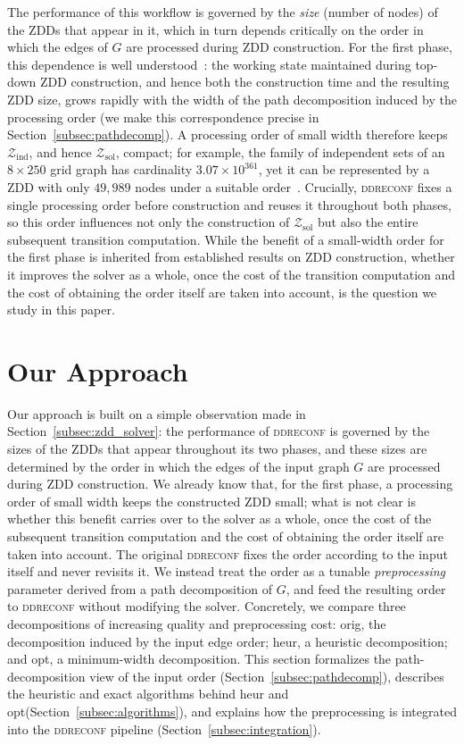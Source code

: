 \documentclass[conference]{IEEEtran}
\newcommand{\zind}{\mathcal{Z}_{\mathrm{ind}}}
\newcommand{\zsol}{\mathcal{Z}_{\mathrm{sol}}}
\newcommand{\OrigDecom}{\textsf{orig}\xspace}
\newcommand{\HeurDecom}{\textsf{heur}\xspace}
\newcommand{\OptDecom}{\textsf{opt}\xspace}
\begin{document}
The performance of this workflow is governed by the \emph{size} (number of
nodes) of the ZDDs that appear in it, which in turn depends critically on the
order in which the edges of $G$ are processed during ZDD construction. For the
first phase, this dependence is well understood~\cite{inoue16}: the working state
maintained during top-down ZDD construction, and hence both the construction
time and the resulting ZDD size, grows rapidly with the width of the path
decomposition induced by the processing order (we make this correspondence
precise in Section~\ref{subsec:pathdecomp}). A processing order of small width
therefore keeps $\zind$, and hence $\zsol$, compact; for example, the family of
independent sets of an $8 \times 250$ grid graph has cardinality
$3.07 \times 10^{361}$, yet it can be represented by a ZDD with only $49{,}989$
nodes under a suitable order~\cite{ItoKNSSTT23}. Crucially, \textsc{ddreconf}
fixes a single processing order before construction and reuses it throughout
both phases, so this order influences not only the construction of $\zsol$ but
also the entire subsequent transition computation. While the benefit of a
small-width order for the first phase is inherited from established results on
ZDD construction, whether it improves the solver as a whole, once the cost of
the transition computation and the cost of obtaining the order itself are taken
into account, is the question we study in this paper.

\section{Our Approach}
\label{sec:approach}

Our approach is built on a simple observation made in
Section~\ref{subsec:zdd_solver}: the performance of \textsc{ddreconf} is governed
by the sizes of the ZDDs that appear throughout its two phases, and these sizes
are determined by the order in which the edges of the input graph $G$ are
processed during ZDD construction. We already know that, for the first phase, a
processing order of small width keeps the constructed ZDD small; what is not
clear is whether this benefit carries over to the solver as a whole, once the
cost of the subsequent transition computation and the cost of obtaining the
order itself are taken into account. The original \textsc{ddreconf} fixes the
order according to the input itself and never revisits it. We instead treat the
order as a tunable \emph{preprocessing} parameter derived from a path
decomposition of $G$, and feed the resulting order to \textsc{ddreconf} without
modifying the solver. Concretely, we compare three decompositions of increasing quality
and preprocessing cost: \OrigDecom, the decomposition induced by the input edge
order; \HeurDecom, a heuristic decomposition; and \OptDecom, a minimum-width
decomposition. This
section formalizes the path-decomposition view of the input order
(Section~\ref{subsec:pathdecomp}), describes the heuristic and exact algorithms
behind \HeurDecom and \OptDecom (Section~\ref{subsec:algorithms}), and explains
how the preprocessing is integrated into the \textsc{ddreconf} pipeline
(Section~\ref{subsec:integration}).
\end{document}
